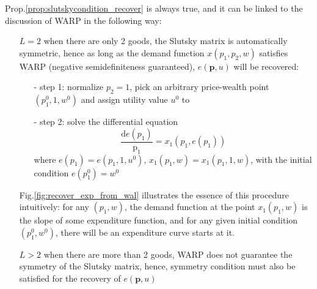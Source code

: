Prop.\ref{prop:slutskycondition_recover} is always true, and it can be linked to the discussion of WARP in the following way:
\begin{enumerate}
    \item[$L=2$] when there are only 2 goods, the Slutsky matrix is automatically symmetric, hence as long as the demand function $x(p_1,p_2,w)$ satisfies WARP (negative semidefiniteness guaranteed), $e(\mathbf{p},u)$ will be recovered:
    
    \begin{enumerate}
        \item[-] step 1: normalize $p_2=1$, pick an arbitrary price-wealth point $(p_1^0,1,w^0)$ and assign utility value $u^0$ to 
        \item[-] step 2: solve the differential equation 
        $$
        \frac{\mathrm{d}e(p_1)}{\mathrm{p_1}}=x_1(p_1,e(p_1))
        $$
        where $e(p_1)=e(p_1,1,u^0)$, $x_1(p_1,w)=x_1(p_1,1,w)$, with the initial condition $e(p_1^0)=w^0$
    \end{enumerate}
    Fig.\ref{fig:recover_exp_from_wal} illustrates the essence of this procedure intuitively: for any $(p_1,w)$, the demand function at the point $x_1(p_1,w)$ is the slope of some expenditure function, and for any given initial condition $(p_1^0,w^0)$, there will be an expenditure curve starts at it.
    \item[$L>2$] when there are more than 2 goods, WARP does not guarantee the symmetry of the Slutsky matrix, hence, symmetry condition must also be satisfied for the recovery of $e(\mathbf{p},u)$
\end{enumerate} 

